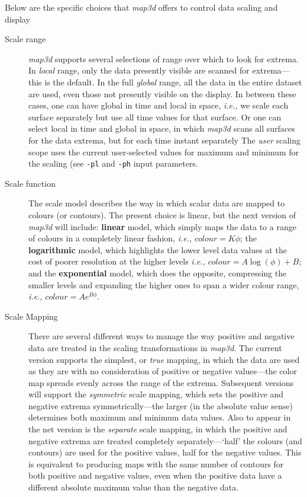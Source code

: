 \documentclass[11pt]{article}
\newcommand{\ie}{{\em i.e.,}}
\newcommand{\map}{\emph{map3d}}
\begin{document}
Below are the specific choices that \map{} offers to control data scaling
and display
\begin{description}
  
  \item[Scale range] \map{} supports several selections of range over
        which to look for extrema.  In {\em local\/} range, only the data
        presently visible 
        are scanned for extrema---this is the default.  In the full {\em
        global\/} range, all the data in the entire dataset are used, even
        those not presently visible on the display.  In between these
        cases, one can have global in time and local in space, \ie{} we
        scale each surface separately but use all time values for that
        surface.  Or one can 
        select local in time and global in space, in which \map{} scans all
        surfaces for the data extrema, but for each time instant separately
        The {\em user\/} scaling scope uses the current user-selected
        values for maximum and minimum for the scaling (see {\tt -pl} and
        {\tt -ph} input parameters.
        
  \item[Scale function] The scale model describes the way in which scalar data
        are mapped to colours (or contours).  The present choice is linear,
        but the next version of \map{} will include: \textbf{linear} model,
        which simply maps the data to a range of colours in a completely
        linear fashion, \ie{} \mbox{$colour = K \phi$}; the
        \textbf{logarithmic} model, which highlights the lower level data
        values at the cost of poorer resolution at the higher levels \ie{}
        \mbox{$colour = A\log(\phi) + B$}; and the \textbf{exponential}
        model, which does the opposite, compressing the smaller levels and
        expanding the higher ones to span a wider colour range, \ie{}
        \mbox{$colour = A e^{B\phi}$}.

  \item[Scale Mapping] There are several different ways to manage
        the way positive and negative data are treated in the scaling
        transformations in \map{}.  The current version supports the
        simplest, or {\em true\/} mapping, in which the data are used as
        they are with no consideration of positive or negative values---the
        color map spreads evenly across the range of the extrema.
        Subsequent versions will support the {\em symmetric\/} scale
        mapping, which sets the positive and negative extrema
        symmetrically---the larger (in the absolute value sense) determines
        both maximum and minimum data values.  Also to appear in the net
        version is the {\em separate\/} scale mapping, in which the
        positive and negative extrema are treated completely
        separately---`half' the colours (and contours) are used for the
        positive values, half for the negative values.  This is equivalent
        to producing maps with the same number of contours for both
        positive and negative values, even when the positive data have a
        different absolute maximum value than the negative data.


\end{description}
\end{document}
